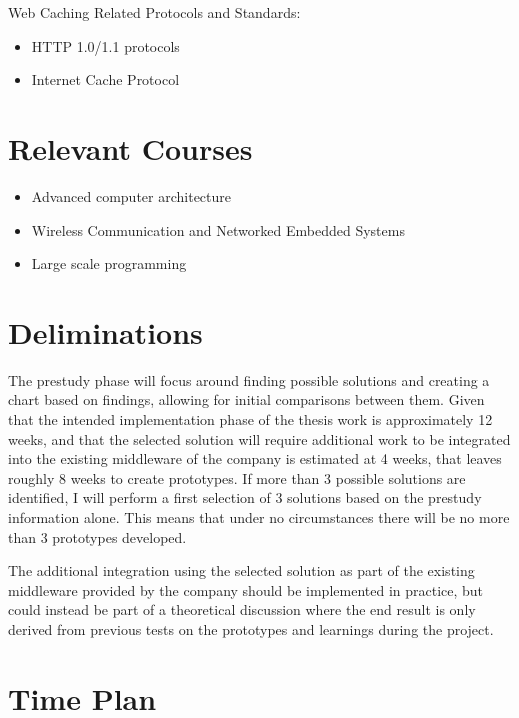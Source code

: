 \documentclass[11pt, a4paper]{scrartcl}
\begin{document}
Web Caching Related Protocols and Standards:
\begin{itemize}
    \item HTTP 1.0/1.1 protocols
    \item Internet Cache Protocol
\end{itemize}

\section{Relevant Courses}

\begin{itemize}
    \item Advanced computer architecture
    \item Wireless Communication and Networked Embedded Systems
    \item Large scale programming
\end{itemize}

\section{Deliminations}

The prestudy phase will focus around finding possible solutions and creating a chart based on findings, allowing for initial comparisons between them. Given that the intended implementation phase of the thesis work is approximately 12 weeks, and that the selected solution will require additional work to be integrated into the existing middleware of the company is estimated at 4 weeks, that leaves roughly 8 weeks to create prototypes. If more than 3 possible solutions are identified, I will perform a first selection of 3 solutions based on the prestudy information alone. This means that under no circumstances there will be no more than 3 prototypes developed.

The additional integration using the selected solution as part of the existing middleware provided by the company should be implemented in practice, but could instead be part of a theoretical discussion where the end result is only derived from previous tests on the prototypes and learnings during the project.

\section{Time Plan}
\end{document}
